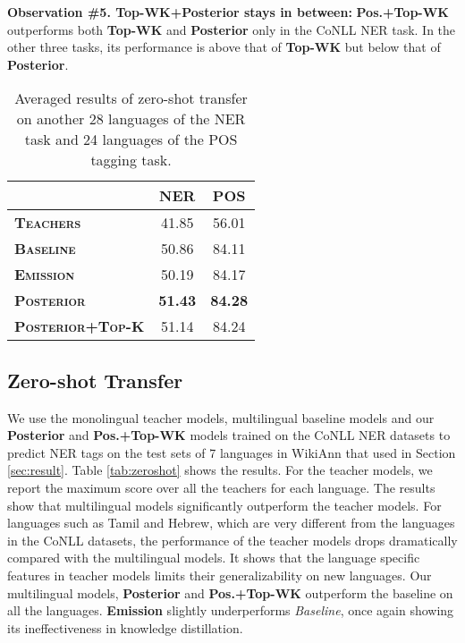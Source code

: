 \documentclass[11pt,a4paper]{article}
\begin{document}
\noindent\textbf{Observation \#5. Top-WK+Posterior stays in between:}
\textbf{Pos.+Top-WK} outperforms both \textbf{Top-WK} and \textbf{Posterior} only in the CoNLL NER task. In the other three tasks, its performance is above that of \textbf{Top-WK} but below that of \textbf{Posterior}.





\begin{table}[t]
\centering
\small
\begin{tabular}{l|cc}
\hline\hline
& \textbf{NER} & \textbf{POS} \\
\hline
{\bf\textsc{Teachers}} & 41.85 & 56.01 \\
{\bf\textsc{Baseline}} & 50.86 & 84.11 \\
{\bf\textsc{Emission}} & 50.19 & 84.17 \\
{\bf\textsc{Posterior}} & \textbf{51.43} & \textbf{84.28} \\
{\bf\textsc{Posterior+Top-K}} & 51.14 & 84.24\\
\hline\hline
\end{tabular}
\caption{Averaged results of zero-shot transfer on another 28 languages of the NER task and 24 languages of the POS tagging task.}
\label{tab:averaged_zs}
\end{table}


\subsection{Zero-shot Transfer}
We use the monolingual teacher models, multilingual baseline models and our \textbf{Posterior} and \textbf{Pos.+Top-WK} models trained on the CoNLL NER datasets to predict NER tags on the test sets of 7 languages in WikiAnn that used in Section \ref{sec:result}. Table \ref{tab:zeroshot} shows the results. For the teacher models, we report the maximum score over all the teachers for each language. The results show that multilingual models significantly outperform the teacher models. For languages such as Tamil and Hebrew, which are very different from the languages in the CoNLL datasets, the performance of the teacher models drops dramatically compared with the multilingual models. It shows that the language specific features in teacher models limits their generalizability on new languages. Our multilingual models, \textbf{Posterior} and \textbf{Pos.+Top-WK} outperform the baseline on all the languages. \textbf{Emission} slightly underperforms \textit{Baseline}, once again showing its ineffectiveness in knowledge distillation. 
\end{document}

